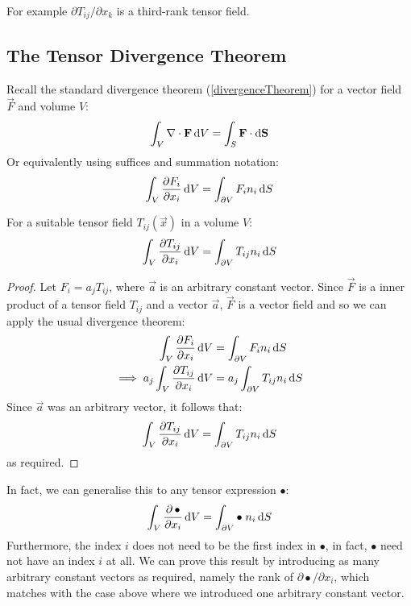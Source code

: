 \documentclass[../main.tex]{subfiles}
\begin{document}
For example $\partial T_{i j}/\partial x_k$ is a third-rank tensor field.
\subsection{The Tensor Divergence Theorem}
\nonexaminable
\begin{remark}[Recap]
  Recall the standard divergence theorem (\cref{divergenceTheorem}) for a vector field $\vec{F}$ and volume $V$:
  \[
    \int_{V} \nabla \cdot \vec{F} \d{V} = \int_{S} \vec{F} \cdot \d{\vec{S}}
  \]
  Or equivalently using suffices and summation notation:
  \[
    \int_{V} \pderiv{F_i}{x_i} \d{V} = \int_{\partial V} F_i n_i \d{S}
  \]
\end{remark}
\begin{theorem}
  For a suitable tensor field $T_{i j}(\vec{x})$ in a volume $V$:
  \[
    \int_{V} \pderiv{T_{i j}}{x_i} \d{V} = \int_{\partial V} T_{i j}n_i \d{S}
  \]
\end{theorem}
\begin{proof}
  Let $F_i = a_j T_{i j}$, where $\vec{a}$ is an arbitrary constant vector.
  Since $\vec{F}$ is a inner product of a tensor field $T_{i j}$ and a vector $\vec{a}$, $\vec{F}$ is a vector field and so we can apply the usual divergence theorem:
  \begin{align*}
    \int_{V} \pderiv{F_i}{x_i} \d{V} &= \int_{\partial V} F_i n_i \d{S} \\
    \implies a_j \int_{V} \pderiv{T_{i j}}{x_i} \d{V} &= a_j \int_{\partial V} T_{i j}n_i \d{S}
  \end{align*}
  Since $\vec{a}$ was an arbitrary vector, it follows that:
  \[
    \int_{V} \pderiv{T_{i j}}{x_i} \d{V} = \int_{\partial V} T_{i j}n_i \d{S}
  \]
  as required.
\end{proof}
In fact, we can generalise this to any tensor expression $\bullet$:
\[
  \int_{V} \pderiv{\, \bullet}{x_i} \d{V} = \int_{\partial V} \bullet\; n_i \d{S}
\]
Furthermore, the index $i$ does not need to be the first index in $\bullet$, in fact, $\bullet$ need not have an index $i$ at all.
We can prove this result by introducing as many arbitrary constant vectors as required, namely the rank of $\partial \bullet/\partial x_i$, which matches with the case above where we introduced one arbitrary constant vector.
\end{document}
